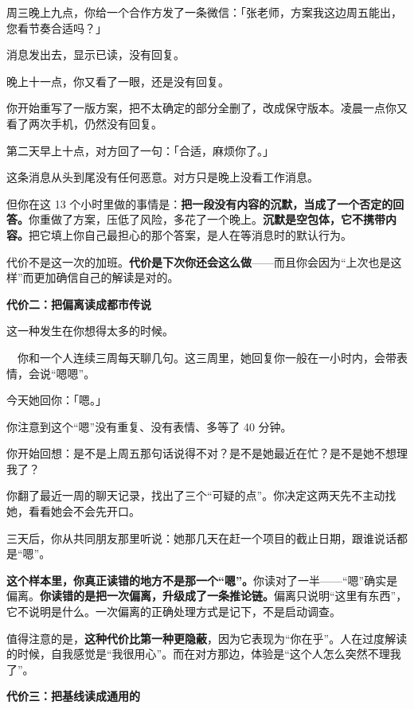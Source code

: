 \begin{mdquote}


周三晚上九点，你给一个合作方发了一条微信：「张老师，方案我这边周五能出，您看节奏合适吗？」

消息发出去，显示已读，没有回复。

晚上十一点，你又看了一眼，还是没有回复。

你开始重写了一版方案，把不太确定的部分全删了，改成保守版本。凌晨一点你又看了两次手机，仍然没有回复。

第二天早上十点，对方回了一句：「合适，麻烦你了。」
\end{mdquote}

这条消息从头到尾没有任何恶意。对方只是晚上没看工作消息。

但你在这 13 个小时里做的事情是：\textbf{把一段没有内容的沉默，当成了一个否定的回答。}你重做了方案，压低了风险，多花了一个晚上。\textbf{沉默是空包体，它不携带内容。}把它填上你自己最担心的那个答案，是人在等消息时的默认行为。

代价不是这一次的加班。\textbf{代价是下次你还会这么做}——而且你会因为“上次也是这样”而更加确信自己的解读是对的。

\textbf{代价二：把偏离读成都市传说}

这一种发生在你想得太多的时候。

\begin{mdquote}
　你和一个人连续三周每天聊几句。这三周里，她回复你一般在一小时内，会带表情，会说“嗯嗯”。

今天她回你：「嗯。」

你注意到这个“嗯”没有重复、没有表情、多等了 40 分钟。

你开始回想：是不是上周五那句话说得不对？是不是她最近在忙？是不是她不想理我了？

你翻了最近一周的聊天记录，找出了三个“可疑的点”。你决定这两天先不主动找她，看看她会不会先开口。
\end{mdquote}

三天后，你从共同朋友那里听说：她那几天在赶一个项目的截止日期，跟谁说话都是“嗯”。

\textbf{这个样本里，你真正读错的地方不是那一个“嗯”。}你读对了一半——“嗯”确实是偏离。\textbf{你读错的是把一次偏离，升级成了一条推论链。}偏离只说明“这里有东西”，它不说明是什么。一次偏离的正确处理方式是记下，不是启动调查。

值得注意的是，\textbf{这种代价比第一种更隐蔽}，因为它表现为“你在乎”。人在过度解读的时候，自我感觉是“我很用心”。而在对方那边，体验是“这个人怎么突然不理我了”。

\textbf{代价三：把基线读成通用的}

